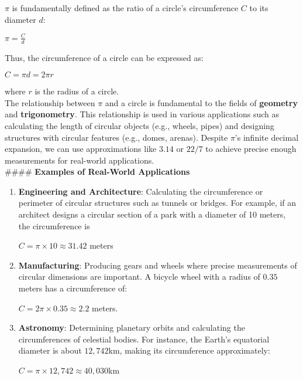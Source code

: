 \documentclass[12pt]{article}
\begin{document}
\noindent $\pi$ is fundamentally defined as the ratio of a circle's circumference $C$ to its diameter $d$:
\begin{center}
    $\pi = \frac{C}{d}$
\end{center}

\noindent Thus, the circumference of a circle can be expressed as:
\begin{center}
    $C = \pi d = 2\pi r$
\end{center}
where \(r\) is the radius of a circle.\\

\noindent The relationship between $\pi$ and a circle is fundamental to the fields of \textbf{geometry} and \textbf{trigonometry}. This relationship is used in various applications such as calculating the length of circular objects (e.g., wheels, pipes) and designing structures with circular features (e.g., domes, arenas). Despite $\pi$'s infinite decimal expansion, we can use approximations like $3.14$ or $22/7$ to achieve precise enough measurements for real-world applications.\\

#### \textbf{Examples of Real-World Applications}
\begin{enumerate}
    \item \textbf{Engineering and Architecture}:
    Calculating the circumference or perimeter of circular structures such as tunnels or bridges. For example, if an architect designs a circular section of a park with a diameter of 10 meters, the circumference is
    \begin{center}
        $C = \pi \times 10 \approx 31.42$ meters
    \end{center}
    \item \textbf{Manufacturing}:
    Producing gears and wheels where precise measurements of circular dimensions are important. A bicycle wheel with a radius of $0.35$ meters has a circumference of:
    \begin{center}
        $C = 2\pi \times 0.35 \approx 2.2$ meters.
    \end{center}
    \item \textbf{Astronomy}:
    Determining planetary orbits and calculating the circumferences of celestial bodies. For instance, the Earth's equatorial diameter is about $12,742$km, making its circumference approximately:
    \begin{center}
        $C = \pi \times 12,742 \approx 40,030$km
    \end{center}
\end{enumerate}
\end{document}
